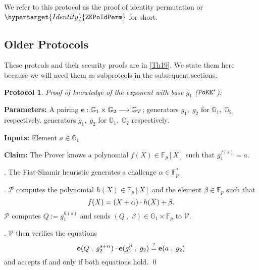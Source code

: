 \documentclass[11pt, lettersize, notitlepage, leqno, footskip=0.6cm]{article}
\newcommand{\bFp}{\mathbb{F}_p}
\newcommand{\lra}{\longrightarrow}
\newcommand{\mc}{\mathcal}
\newcommand{\mb}{\mathbb}
\newcommand{\al}{\alpha}
\newcommand{\be}{\beta}
\newcommand{\mP}{\mc{P}}
\newcommand{\V}{\mc{V}}
\newcommand{\vs}{\vspace{-0.15cm}}
\newcommand{\noin}{\noindent}
\newcommand{\sta}{\stackrel{?}{=}}
\newtheorem{Prot}[Thm]{Protocol}
\numberwithin{equation}{section}
\begin{document}
We refer to this protocol as the proof of identity permutation or $\hypertarget{Identity}{\tt{ZKPoIdPerm}}$ for short.









\subsection{\fontsize{11}{11}\selectfont Older Protocols} 


These protcols and their security proofs are in \href{https://eprint.iacr.org/2019/1147}{[Th19]}. We state them here because we will need them as subprotcols in the subsequent sections.

\bigskip


\begin{mdframed}

\begin{Prot} \normalfont \hypertarget{ZKPoKE*}{\textit{Proof of knowledge of the exponent with base $g_1$}} (${\tt{PoKE}}^*$):\end{Prot} 

\noin \textbf{Parameters:} A pairing ${\bf{e}}:\mb{G}_1\times \mb{G}_2\lra \mb{G}_T$; generators $g_1,\;g_2$ for $\mb{G}_1,\; \mb{G}_2$ respectively.
generators $g_1,\;g_2$ for $\mb{G}_1,\; \mb{G}_2$ respectively.

\noin \textbf{Inputs:} Element $a \in \mb{G}_1$

\noin \textbf{Claim:} The Prover knows a polynomial $f(X)\in \bFp[X]$ such that $g_1^{f(s)} = a$.\vspace{1mm}

\noin {}. The Fiat-Shamir heuristic generates a challenge $\al\in \bFp^*$.

\noin 2. $\mP$ computes the polynomial $h(X)\in \bFp[X]$ and the element $\be\in \bFp$ such that \vs $$f(X) = (X+\al)\cdot h(X)+ \be. \vs $$ $\mP$ computes $Q:= g_1^{h(s)}$ and sends $(Q\;,\;\be)\in \mb{G}_1\times \bFp$ to $\V$.

\noin 3. $\V$ then verifies the equations \vspace{-2.5mm} $$\mathbf{e}(Q\;,\; g_2^{s+\al})\cdot \mathbf{e}(g_1^{\be}\;,\; g_2) \sta \mathbf{e}(a\;,\; g_2) \vs $$ and accepts if and only if both equations hold. \qed \end{mdframed}

\bigskip
\end{document}
